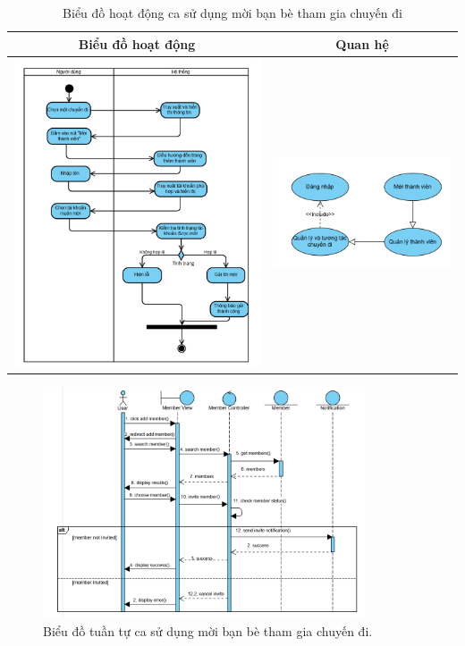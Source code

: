 \begin{table}[H] %
    \centering
    \caption{Biểu đồ hoạt động ca sử dụng mời bạn bè tham gia chuyến đi} %
    \label{tab:uc_invite_friend_diagrams} %
    \begin{tabular}{| c | c |}
        \hline
        \textbf{Biểu đồ hoạt động} & \textbf{Quan hệ} \\
        \hline
        \includegraphics[width=0.5\linewidth]{figures/c3/3-3-14-ad.png} %
        &
        \includegraphics[width=0.45\linewidth]{figures/c3/3-3-14-rd.png} \\ %
        \hline
    \end{tabular}
\end{table}

\begin{figure}[H]
    \centering
    \includegraphics[width=0.85\textwidth]{figures/c3/3-3-14-sd.png} %
    \caption{Biểu đồ tuần tự ca sử dụng mời bạn bè tham gia chuyến đi.} %
    \label{fig:3-3-14-sequence-diagram}
\end{figure}
